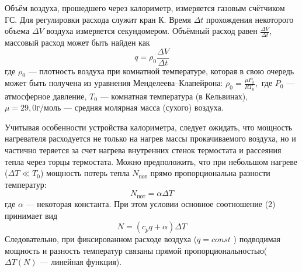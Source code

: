 \documentclass[12pt,a4paper]{article}
\begin{document}
Объём воздуха, прошедшего через калориметр, измеряется газовым счётчиком ГС. Для регулировки расхода служит кран К. Время $\Delta t$ прохождения
некоторого объема $\Delta V$ воздуха измеряется секундомером. Объёмный расход равен $\frac{\Delta V}{\Delta t} $, массовый расход может быть найден как 
\begin{equation}
    q = \rho_{0} \frac{\Delta V}{\Delta t}
\end{equation} 
где $\rho_{0}$ — плотность воздуха при комнатной температуре, которая в свою очередь может быть получена из уравнения Менделеева–Клапейрона: $\rho_{0}= \frac{\mu P_{0} }{R T_{0}},$ где $P_{0}$ — атмосферное давление, $T_{0}$ — комнатная температура (в Кельвинах), $\mu = 29,0 {г/моль}$ — средняя молярная масса (сухого) воздуха.

Учитывая особенности устройства калориметра, следует ожидать, что мощность нагревателя расходуется не только на нагрев массы прокачиваемого воздуха, но и частично теряется за счет нагрева внутренних стенок термостата и рассеяния тепла через торцы термостата. Можно предположить, что при небольшом нагреве ($\Delta T \ll T_{0}$) мощность потерь тепла $N_{пот}$ прямо пропорциональна разности температур:
\begin{equation}
    N_{пот} = \alpha \Delta T
\end{equation}
где $\alpha$ — некоторая константа. При этом условии основное соотношение (2) принимает вид 
\begin{equation}
    N = (c_{p}q +\alpha)\Delta T 
\end{equation}
Следовательно, при фиксированном расходе воздуха ($q = const$ ) подводимая мощность и разность температур связаны прямой пропорциональностью($\Delta T(N)$ — линейная функция).
\end{document}

